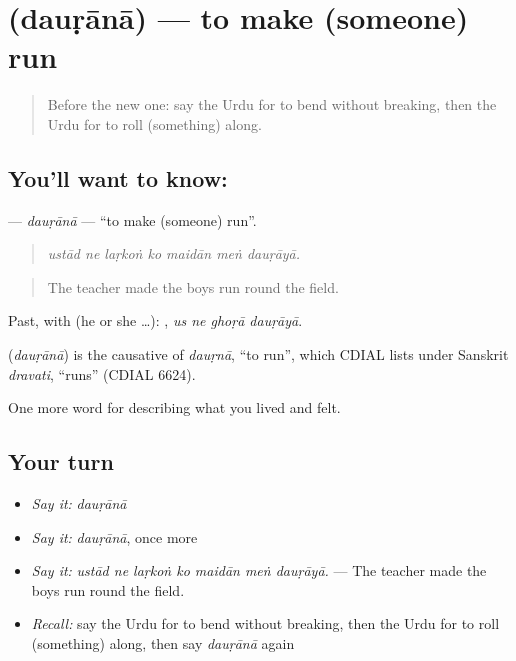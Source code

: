\section[\texorpdfstring{\ur{دوڑانا} (dauṛānā)}{دوڑانا (dauṛānā)}]{ (dauṛānā) — to make (someone) run}

\label{lesson:UR-C522-daurana}



\begin{quote}
Before the new one: say the Urdu for to bend without breaking, then the Urdu for to roll (something) along.
\end{quote}

\subsection*{You'll want to know: }
\textbf{} — \emph{dauṛānā} — \textquotedblleft{}to make (someone) run\textquotedblright{}.

\begin{quote}
      
\end{quote}

\begin{quote}
\emph{ustād ne laṛkoṅ ko maidān meṅ dauṛāyā.}
\end{quote}

\begin{quote}
The teacher made the boys run round the field.
\end{quote}

Past, with  (he or she …):    , \emph{us ne ghoṛā dauṛāyā}.

\begin{cousinweb}
\textbf{} (\emph{dauṛānā}) is the causative of \emph{dauṛnā}, \textquotedblleft{}to run\textquotedblright{}, which CDIAL lists under Sanskrit \emph{dravati}, \textquotedblleft{}runs\textquotedblright{} (CDIAL 6624).
\end{cousinweb}

\begin{grammarlens}[title={What you've built}]
One more word for describing what you lived and felt.
\end{grammarlens}

\subsection*{Your turn}
\begin{itemize}
\raggedright
  \item \emph{Say it:} \emph{dauṛānā}
  \item \emph{Say it:} \emph{dauṛānā}, once more
  \item \emph{Say it:} \emph{ustād ne laṛkoṅ ko maidān meṅ dauṛāyā.} — The teacher made the boys run round the field.
  \item \emph{Recall:} say the Urdu for to bend without breaking, then the Urdu for to roll (something) along, then say \emph{dauṛānā} again
\end{itemize}

